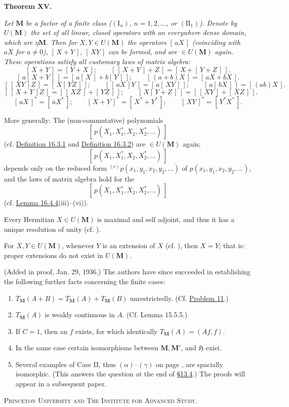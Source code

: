 \documentclass[12pt,b5paper,twoside]{article}
\newcommand{\Hspace}{\mathfrak H}
\newcommand{\M}{\mathbf M}
\newcommand{\clos}[1]{[\,#1\,]}
\newcommand{\MainTheorem}[1]{%
  \par\smallskip\noindent\phantomsection\label{thm:#1}\textbf{Theorem #1.}\enspace
}
\newcommand{\secref}[1]{\hyperref[sec:#1]{\S#1}}
\newcommand{\defref}[1]{\hyperref[def:#1]{Definition #1}}
\newcommand{\lemref}[1]{\hyperref[lem:#1]{Lemma #1}}
\newcommand{\probref}[1]{\hyperref[prob:#1]{Problem #1}}
\begin{document}
\MainTheorem{XV}
{\itshape Let \(\M\) be a factor of a finite class
(\((\mathrm I_n)\), \(n=1,2,\ldots\), or \((\mathrm{II}_1)\)). Denote by
\(U(\M)\) the set of all linear, closed operators with an everywhere dense
domain, which are \(\mathbin\eta\M\). Then for \(X,Y\in U(\M)\) the
operators \(\clos{aX}\) (coinciding with \(aX\) for \(a\ne0\)),
\(\clos{X+Y}\), \(\clos{XY}\) can be formed, and are \(\in U(\M)\) again.
These operations satisfy all customary laws of matrix algebra:
\[
\clos{X+Y}=\clos{Y+X};\qquad
\clos{\clos{X+Y}+Z}=\clos{X+\clos{Y+Z}}.
\]
\[
\clos{a\clos{X+Y}}=\clos{a\clos X+b\clos Y};\qquad
\clos{(a+b)X}=\clos{aX+bX}.
\]
\[
\clos{\clos{XY}Z}=\clos{X\clos{YZ}};\qquad
\clos{\clos{aX}Y}=\clos{a\clos{XY}};\qquad
\clos{a\clos{bX}}=\clos{(ab)X}.
\]
\[
\clos{\clos{X+Y}Z}=\clos{\clos{XZ}+\clos{YZ}};\qquad
\clos{X\clos{Y+Z}}=\clos{\clos{XY}+\clos{XZ}}.
\]
\[
\clos{aX}^{*}=\clos{\overline aX^*};\qquad
\clos{X+Y}^{*}=\clos{X^*+Y^*};\qquad
\clos{XY}^{*}=\clos{Y^*X^*}.
\]

More generally: The (non-commutative) polynomials
\[
\clos{p(X_1,X_1^*,X_2,X_2^*,\ldots)}
\]
(cf. \defref{16.3.1} and
\defref{16.3.2}) are \(\in U(\M)\) again;
\[
\clos{p(X_1,X_1^*,X_2,X_2^*,\ldots)}
\]
depends only on the reduced form
\({}^{(r)}p(x_1,y_1,x_2,y_2,\ldots)\) of
\(p(x_1,y_1,x_2,y_2,\ldots)\), and the laws of matrix algebra hold for the
\[
\clos{p(X_1,X_1^*,X_2,X_2^*,\ldots)}
\]
(cf. \lemref{16.4.4}(iii)--(vi)).

Every Hermitian \(X\in U(\M)\) is maximal and self adjoint, and thus it has
a unique resolution of unity (cf. \cite[p.~92]{ref15}).

For \(X,Y\in U(\M)\), whenever \(Y\) is an extension of \(X\) (cf.
\cite[p.~70]{ref15}), then \(X=Y\); that is: proper extensions do not exist
in \(U(\M)\).}

\medskip
\noindent(Added in proof, Jan. 29, 1936.) The authors have since succeeded
in establishing the following further facts concerning the finite cases:
\begin{enumerate}[label=(\roman*)]
\item \(T_{\M}(A+B)=T_{\M}(A)+T_{\M}(B)\) unrestrictedly.
  (Cf. \probref{11}.)
\item \(T_{\M}(A)\) is weakly continuous in \(A\).
  (Cf. Lemma 15.5.5.)
\item If \(C=1\), then an \(f\) exists, for which identically
  \(T_{\M}(A)=(Af,f)\).
\item In the same case certain isomorphisms between \(\M,\M'\), and
  \(\Hspace\) exist.
\item Several examples of Case II, thus \((\alpha)\)--\((\gamma)\) on page
  \pageref{examples:13.2}, are spacially
  isomorphic. (This answers the question at the end of \secref{13.4}.) The
  proofs will appear in a subsequent paper.
\end{enumerate}

\begin{center}
\textsc{Princeton University and The Institute for Advanced Study.}
\end{center}
\end{document}
